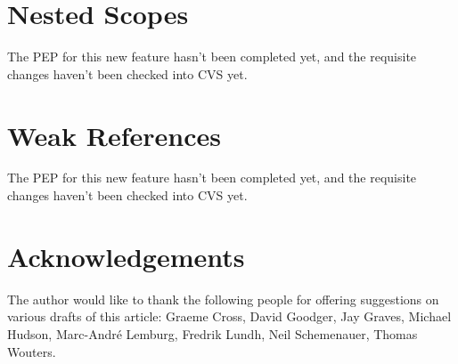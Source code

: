 \documentclass{howto}
\begin{document}
\section{Nested Scopes}

The PEP for this new feature hasn't been completed yet, and the
requisite changes haven't been checked into CVS yet.

\begin{seealso}


\end{seealso}


\section{Weak References}

The PEP for this new feature hasn't been completed yet, and the
requisite changes haven't been checked into CVS yet.


\begin{seealso}


\end{seealso}


\section{Acknowledgements}

The author would like to thank the following people for offering suggestions
on various drafts of this article: Graeme Cross, 
David Goodger, Jay Graves, Michael Hudson,
Marc-Andr\'e Lemburg, Fredrik Lundh, Neil Schemenauer, Thomas Wouters.
\end{document}
